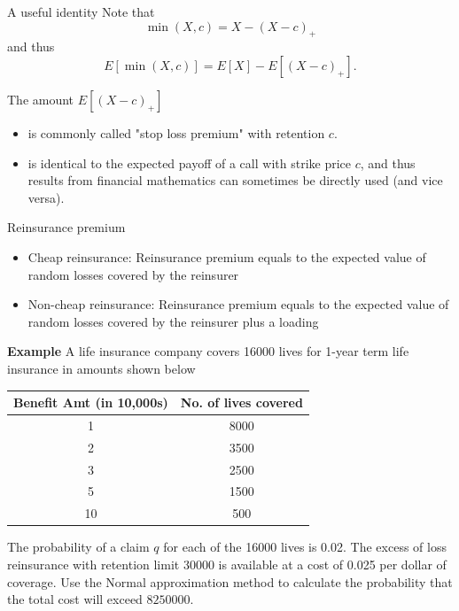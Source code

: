 \documentclass[11pt]{beamer}
\begin{document}
\begin{frame}{A useful identity}
   Note that
   $$\min(X,c)=X-(X-c)_+$$
   and thus
   $$E[\min(X,c)]=E[X]-E[(X-c)_+].$$
   
\vfill   
   
   The amount $E[(X-c)_+]$      
   \begin{itemize}
   \item is commonly called "stop loss premium" with retention $c$.
   \item is identical to the expected payoff of a call with strike price $c$, and thus results from financial mathematics can sometimes be directly used (and vice versa).
   \end{itemize}
\end{frame}
\begin{frame}{Reinsurance premium}
   \begin{itemize}
   \item Cheap reinsurance: Reinsurance premium equals to the expected value of random losses covered by the reinsurer
   
\vfill   
   
   \item Non-cheap reinsurance: Reinsurance premium equals to the expected value of random losses covered by the reinsurer plus a loading
   \end{itemize}
\end{frame}
\begin{frame}
\textbf{Example} A life insurance company covers 16000 lives for 1-year term life insurance in amounts shown below\\

\begin{table}[]
\begin{tabular}{|c|c|}
\hline
Benefit Amt (in 10,000s) & No. of lives covered \\ \hline
1                        & 8000                 \\ \hline
2                        & 3500                 \\ \hline
3                        & 2500                 \\ \hline
5                        & 1500                 \\ \hline
10                       & 500                  \\ \hline
\end{tabular}
\end{table}

The probability of a claim $q$ for each of the 16000 lives is 0.02. The excess of loss reinsurance with retention limit 30000 is available at a cost of 0.025 per dollar of coverage. Use the Normal approximation method to calculate the probability that the total cost will exceed $8250000$.

\end{frame}
\end{document}
